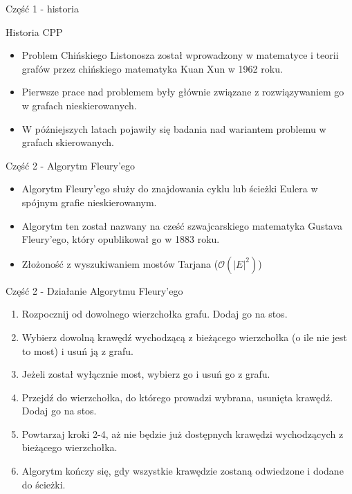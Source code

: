 \documentclass[polish,envcountsect,10pt]{beamer}
\begin{document}
\begin{frame}{Część 1 - historia}
    \begin{block}{Historia CPP}
        \begin{itemize}
            \item Problem Chińskiego Listonosza został wprowadzony w matematyce i teorii grafów przez chińskiego matematyka Kuan Xun w 1962 roku.
            \item Pierwsze prace nad problemem były głównie związane z rozwiązywaniem go w grafach nieskierowanych.
            \item W późniejszych latach pojawiły się badania nad wariantem problemu w grafach skierowanych.
        \end{itemize}
    \end{block}
\end{frame}

\begin{frame}{Część 2 - Algorytm Fleury'ego}
    \begin{block}{}
        \begin{itemize}
            \item Algorytm Fleury'ego służy do znajdowania cyklu lub ścieżki Eulera w spójnym grafie nieskierowanym.
            \item Algorytm ten został nazwany na cześć szwajcarskiego matematyka Gustava Fleury'ego, który opublikował go w 1883 roku.
            \item Złożoność z wyszukiwaniem mostów Tarjana ($\mathcal{O}(|E|^2)$)
        \end{itemize}
    \end{block}
\end{frame}

\begin{frame}{Część 2 - Działanie Algorytmu Fleury'ego}
    \begin{enumerate}
        \item Rozpocznij od dowolnego wierzchołka grafu. Dodaj go na stos.
        \item Wybierz dowolną krawędź wychodzącą z bieżącego wierzchołka (o ile nie jest to most)  i usuń ją z grafu.
        \item Jeżeli został wyłącznie most, wybierz go i usuń go z grafu.
        \item Przejdź do wierzchołka, do którego prowadzi wybrana, usunięta krawędź. Dodaj go na stos.
        \item Powtarzaj kroki 2-4, aż nie będzie już dostępnych krawędzi wychodzących z bieżącego wierzchołka.
        \item Algorytm kończy się, gdy wszystkie krawędzie zostaną odwiedzone i dodane do ścieżki.
    \end{enumerate}
\end{frame}
\end{document}
